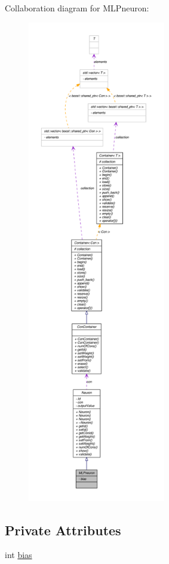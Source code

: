 Collaboration diagram for MLPneuron:\nopagebreak
\begin{figure}[H]
\begin{center}
\leavevmode
\includegraphics[height=600pt]{class_m_l_pneuron__coll__graph}
\end{center}
\end{figure}
\subsection*{Private Attributes}
\begin{DoxyCompactItemize}
\item 
int \hyperlink{class_m_l_pneuron_a6f8cb5b2fbf48db003ea8a413ffdbd8b}{bias}
\end{DoxyCompactItemize}


